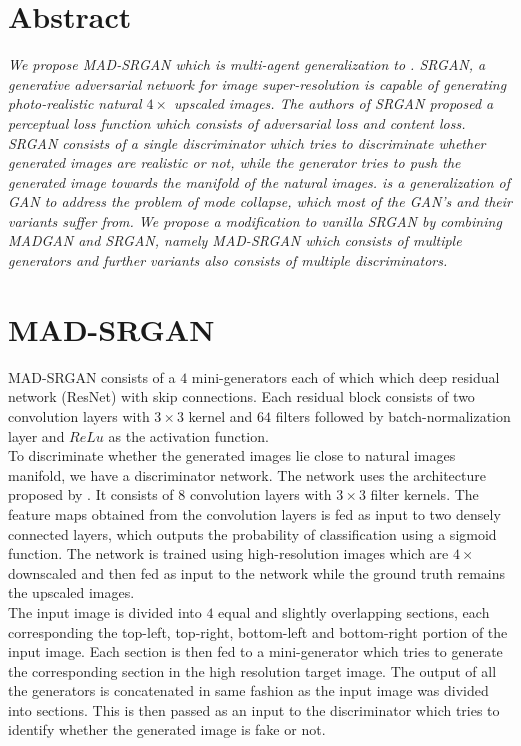 \documentclass[12pt,a4paper,twocolumn]{article}
\begin{document}
    \section{Abstract}
   {\it We propose MAD-SRGAN which is multi-agent generalization to \cite{SRGAN}. SRGAN, a generative adversarial network for image super-resolution is capable of generating photo-realistic natural $4\times$ upscaled images. The authors of SRGAN proposed a perceptual loss function which consists of adversarial loss and content loss.\\

    SRGAN consists of a single discriminator which tries to discriminate whether generated images are realistic or not, while the generator tries to push the generated image towards the manifold of the natural images. \cite{MADGAN} is a generalization of GAN to address the problem of mode collapse, which most of the GAN's and their variants suffer from. We propose a modification to vanilla SRGAN by combining MADGAN and SRGAN, namely MAD-SRGAN which consists of multiple generators and further variants also consists of multiple discriminators. }  
    
    \section{MAD-SRGAN}
    MAD-SRGAN consists of a $4$ mini-generators each of which which deep residual network (ResNet) with skip connections. Each residual block consists of  two convolution layers with $3\times3$ kernel and $64$ filters followed by batch-normalization layer and $ReLu$ as the activation function.\\
    
     To discriminate whether the generated images lie close to natural images manifold, we have a discriminator network. The network uses the architecture proposed by \cite{Radford et al}. It consists of $8$ convolution layers with $3\times3$ filter kernels. The feature maps obtained from the convolution layers is fed as input to two densely connected layers, which outputs the probability of classification using a sigmoid function. The network is trained using high-resolution images which are $4\times$ downscaled and then fed as input to the network while the ground truth remains the upscaled images. \\
     
        The input image is divided into $4$ equal and slightly overlapping sections, each corresponding the top-left, top-right, bottom-left and bottom-right portion of the input image. Each section is then fed to a mini-generator which tries to generate the corresponding section in the high resolution target image. The output of all the generators is concatenated in same fashion as the input image was divided into sections. This is then passed as an input to the discriminator which tries to identify whether the generated image is fake or not. \\
         
\end{document}
